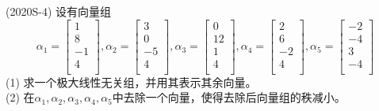 \documentclass[lang=cn,newtx,10pt,scheme=chinese]{elegantbook}
\begin{document}
\begin{exercise}
    (2020S-4) 设有向量组
    $$
    \alpha_1=
    \left[
    \begin{matrix}
        1 \\
        8 \\
        -1 \\
        4 \\
    \end{matrix}
    \right],
    \alpha_2=
    \left[
    \begin{matrix}
        3 \\
        0 \\
        -5 \\
        4 \\
    \end{matrix}
    \right],
    \alpha_3=
    \left[
    \begin{matrix}
        0 \\
        12 \\
        1 \\
        4 \\
    \end{matrix}
    \right],
    \alpha_4=
    \left[
    \begin{matrix}
        2 \\
        6 \\
        -2 \\
        4 \\
    \end{matrix}
    \right],
    \alpha_5=
    \left[
    \begin{matrix}
        -2 \\
        -4 \\
        3 \\
        -4 \\
    \end{matrix}
    \right]
    $$
    (1) 求一个极大线性无关组，并用其表示其余向量。\\
    (2) 在$\alpha_1,\alpha_2,\alpha_3,\alpha_4,\alpha_5$中去除一个向量，使得去除后向量组的秩减小。
\end{exercise}
\end{document}
